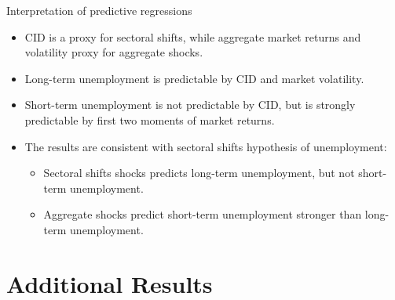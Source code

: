 \documentclass{beamer}
\begin{document}
\normalsize
\begin{frame}{Interpretation of predictive regressions}
    \begin{itemize}
        \item {CID is a proxy for sectoral shifts, while aggregate market returns and volatility proxy for aggregate shocks.}
        \item {Long-term unemployment is predictable by CID and market volatility.}
        \item {Short-term unemployment is not predictable by CID, but is strongly predictable by first two moments of market returns.}
        \item {The results are consistent with sectoral shifts hypothesis of unemployment:}
        \begin{itemize}
            \item {Sectoral shifts shocks predicts long-term unemployment, but not short-term unemployment.}
            \item {Aggregate shocks predict short-term unemployment stronger than long-term unemployment.}
        \end{itemize}
    \end{itemize}
\end{frame}



\section{Additional Results}
\subsection{}
\end{document}
